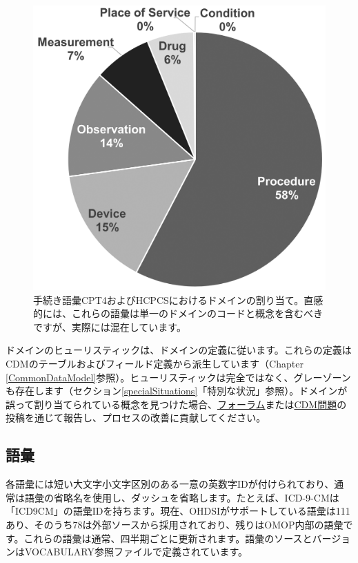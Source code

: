 \documentclass[
  11pt]{book}
\theoremstyle{definition}
\theoremstyle{definition}
\theoremstyle{definition}
\theoremstyle{definition}
\theoremstyle{remark}
\begin{document}
\begin{figure}

{\centering \includegraphics[width=0.7\linewidth]{images/StandardizedVocabularies/domains} 

}

\caption{手続き語彙CPT4およびHCPCSにおけるドメインの割り当て。直感的には、これらの語彙は単一のドメインのコードと概念を含むべきですが、実際には混在しています。}\label{fig:domains}
\end{figure}

ドメインのヒューリスティックは、ドメインの定義に従います。これらの定義はCDMのテーブルおよびフィールド定義から派生しています（Chapter \ref{CommonDataModel}参照）。ヒューリスティックは完全ではなく、グレーゾーンも存在します（セクション\ref{specialSituations}「特別な状況」参照）。ドメインが誤って割り当てられている概念を見つけた場合、\href{https://forums.ohdsi.org}{フォーラム}または\href{https://github.com/OHDSI/CommonDataModel/issues}{CDM問題}の投稿を通じて報告し、プロセスの改善に貢献してください。

\subsection{語彙}\label{ux8a9eux5f59}

各語彙には短い大文字小文字区別のある一意の英数字IDが付けられており、通常は語彙の省略名を使用し、ダッシュを省略します。たとえば、ICD-9-CMは「ICD9CM」の語彙IDを持ちます。現在、OHDSIがサポートしている語彙は111あり、そのうち78は外部ソースから採用されており、残りはOMOP内部の語彙です。これらの語彙は通常、四半期ごとに更新されます。語彙のソースとバージョンはVOCABULARY参照ファイルで定義されています。 
\end{document}

